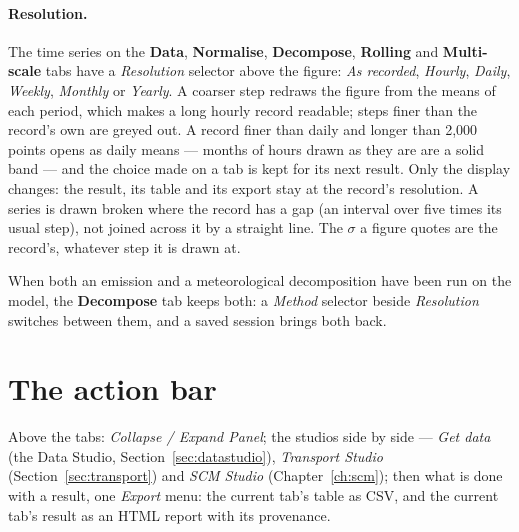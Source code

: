 \documentclass[11pt]{report}
\newcommand{\tab}[1]{\textbf{#1}}
\begin{document}
\paragraph{Resolution.} The time series on the \tab{Data}, \tab{Normalise},
\tab{Decompose}, \tab{Rolling} and \tab{Multi-scale} tabs have a \emph{Resolution} selector above the
figure: \emph{As recorded}, \emph{Hourly}, \emph{Daily}, \emph{Weekly}, \emph{Monthly}
or \emph{Yearly}. A coarser step redraws the figure from the means of each period, which
makes a long hourly record readable; steps finer than the record's own are greyed out.
A record finer than daily and longer than 2,000 points opens as daily means --- months of
hours drawn as they are are a solid band --- and the choice made on a tab is kept for its
next result. Only the display changes: the result, its table and its export stay at the
record's resolution. A series is drawn broken where the record has a gap (an interval
over five times its usual step), not joined across it by a straight line. The $\sigma$ a
figure quotes are the record's, whatever step it is drawn at.

When both an emission and a meteorological decomposition have been run on the model, the
\tab{Decompose} tab keeps both: a \emph{Method} selector beside \emph{Resolution} switches
between them, and a saved session brings both back.

\section{The action bar}
Above the tabs: \emph{Collapse / Expand Panel}; the studios side by side ---
\emph{Get data} (the Data Studio, Section~\ref{sec:datastudio}), \emph{Transport
Studio} (Section~\ref{sec:transport}) and \emph{SCM Studio} (Chapter~\ref{ch:scm}); then
what is done with a result, one \emph{Export} menu: the current tab's table as CSV, and
the current tab's result as an HTML report with its provenance.
\end{document}
